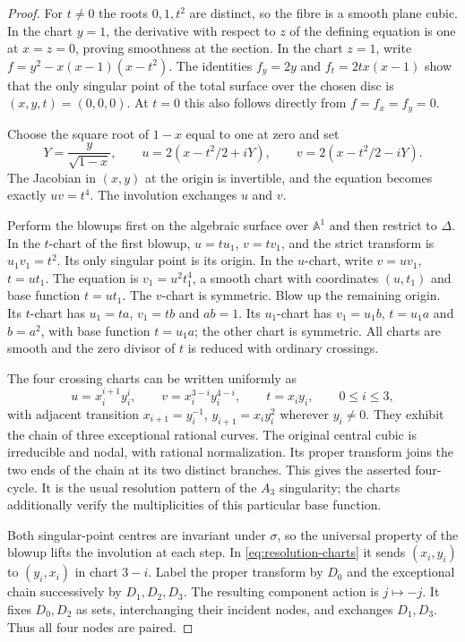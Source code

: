 \begin{proof}
For $t\ne0$ the roots $0,1,t^2$ are distinct, so the fibre is a smooth
plane cubic. In the chart $y=1$, the derivative with respect to $z$ of the
defining equation is one at $x=z=0$, proving smoothness at the section.
In the chart $z=1$, write
$f=y^2-x(x-1)(x-t^2)$. The identities
$f_y=2y$ and $f_t=2tx(x-1)$ show that the only singular point of the total
surface over the chosen disc is $(x,y,t)=(0,0,0)$. At $t=0$ this also
follows directly from $f=f_x=f_y=0$.

Choose the square root of $1-x$ equal to one at zero and set
\begin{equation}\label{eq:a3-coordinates}
 Y=\frac{y}{\sqrt{1-x}},\qquad
 u=2(x-t^2/2+iY),\qquad v=2(x-t^2/2-iY).
\end{equation}
The Jacobian in $(x,y)$ at the origin is invertible, and the equation
becomes exactly $uv=t^4$. The involution exchanges $u$ and $v$.

Perform the blowups first on the algebraic surface over $\mathbb A^1$
and then restrict to $\Delta$. In the $t$-chart of the first blowup,
$u=tu_1$, $v=tv_1$, and the strict transform is $u_1v_1=t^2$.
Its only singular point is its origin. In the $u$-chart, write
$v=uv_1$, $t=ut_1$. The equation is $v_1=u^2t_1^4$, a smooth chart
with coordinates $(u,t_1)$ and base function $t=ut_1$. The $v$-chart
is symmetric. Blow up the remaining origin. Its $t$-chart has
$u_1=ta$, $v_1=tb$ and $ab=1$. Its $u_1$-chart has
$v_1=u_1b$, $t=u_1a$ and $b=a^2$, with base function $t=u_1a$;
the other chart is symmetric. All charts are smooth and the zero divisor
of $t$ is reduced with ordinary crossings.

The four crossing charts can be written uniformly as
\begin{equation}\label{eq:resolution-charts}
 u=x_i^{i+1}y_i^i,\qquad
 v=x_i^{3-i}y_i^{4-i},\qquad t=x_iy_i,
 \qquad 0\le i\le3,
\end{equation}
with adjacent transition
$x_{i+1}=y_i^{-1}$, $y_{i+1}=x_iy_i^2$ wherever $y_i\ne0$.
They exhibit the chain of three exceptional rational curves. The original
central cubic is irreducible and nodal, with rational normalization. Its
proper transform joins the two ends of the chain at its two distinct
branches. This gives the asserted four-cycle. It is the usual resolution
pattern of the $A_3$ singularity; the charts additionally verify the
multiplicities of this particular base function.

Both singular-point centres are invariant under $\sigma$, so the universal
property of the blowup lifts the involution at each step. In
\eqref{eq:resolution-charts} it sends $(x_i,y_i)$ to $(y_i,x_i)$ in
chart $3-i$. Label the proper transform by $D_0$ and the exceptional
chain successively by $D_1,D_2,D_3$. The resulting component action is
$j\mapsto-j$. It fixes $D_0,D_2$ as sets, interchanging their incident
nodes, and exchanges $D_1,D_3$. Thus all four nodes are paired.


\end{proof}

